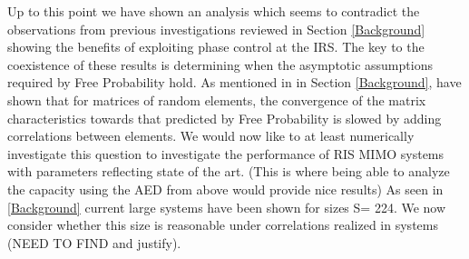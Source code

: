 Up to this point we have shown an analysis which seems to contradict the observations from previous investigations reviewed in Section \ref{Background} showing the benefits of exploiting phase control at the IRS. The key to the coexistence of these results is determining when the asymptotic assumptions required by Free Probability hold. 
As mentioned in in Section \ref{Background}, \cite {} have shown that for matrices of random elements, the  convergence of the matrix characteristics towards that predicted by Free Probability is slowed by adding correlations between elements. We would now like to at least numerically investigate this question to investigate the performance of RIS MIMO systems with parameters reflecting state of the art.
(This is where being able to analyze the capacity using the AED from above would provide nice results)
 As seen in \ref{Background} current large systems have been shown for 
sizes S= 224. We now consider whether this size is reasonable under correlations realized in systems (NEED TO FIND and justify). 
